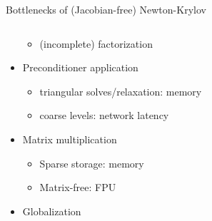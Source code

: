 \begin{frame}{Bottlenecks of (Jacobian-free) Newton-Krylov}
\begin{columns}
\begin{column}{0.6\textwidth}
\begin{itemize}
\begin{itemize}
        \item (incomplete) factorization
        \end{itemize}
      \item Preconditioner application
        \begin{itemize}
        \item triangular solves/relaxation: memory
        \item coarse levels: network latency
        \end{itemize}
      \item Matrix multiplication
        \begin{itemize}
        \item Sparse storage: memory
        \item Matrix-free: FPU
        \end{itemize}
      \item Globalization
      \end{itemize}
    \end{column}
  \end{columns}
\end{frame}
